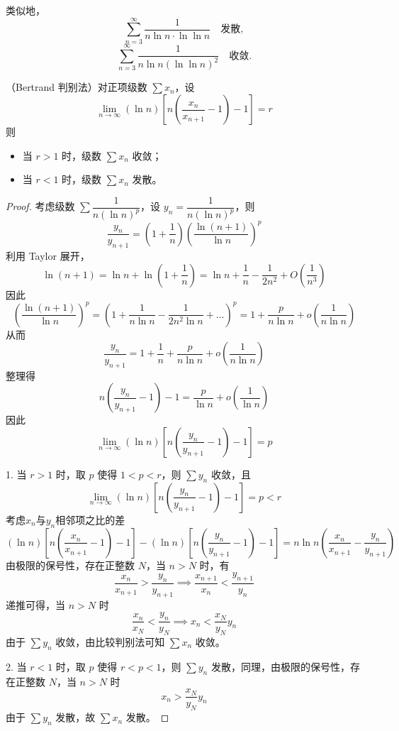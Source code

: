 类似地，
\[
\sum_{n=3}^{\infty} \frac{1}{n \ln n \cdot \ln \ln n} \quad \text{发散},
\]
\[
\sum_{n=3}^{\infty} \frac{1}{n \ln n (\ln \ln n)^2} \quad \text{收敛}.\]
\begin{proposition}
	（Bertrand 判别法）对正项级数 $\sum x_n$，设
	\[
	\lim_{n \to \infty} (\ln n) \left[ n \left( \frac{x_n}{x_{n+1}} - 1 \right) - 1 \right] = r
	\]
	则
	\begin{itemize}
		\item 当 $r > 1$ 时，级数 $\sum x_n$ 收敛；
		\item 当 $r < 1$ 时，级数 $\sum x_n$ 发散。
	\end{itemize}

\end{proposition}
\begin{proof}
	考虑级数 $\sum \dfrac{1}{n(\ln n)^p}$，设 $y_n = \dfrac{1}{n(\ln n)^p}$，则
	\[
	\frac{y_n}{y_{n+1}} = \left(1 + \frac{1}{n}\right) \left( \frac{\ln(n+1)}{\ln n} \right)^p
	\]
	利用 Taylor 展开，
	\[
	\ln(n+1) = \ln n + \ln\left(1+\frac{1}{n}\right) = \ln n + \frac{1}{n} - \frac{1}{2n^2} + O\left(\frac{1}{n^3}\right)
	\]
	因此
	\[
	\left( \frac{\ln(n+1)}{\ln n} \right)^p = \left( 1 + \frac{1}{n \ln n} - \frac{1}{2n^2 \ln n} + \dots \right)^p = 1 + \frac{p}{n \ln n} + o\left( \frac{1}{n \ln n} \right)
	\]
	从而
	\[
	\frac{y_n}{y_{n+1}} = 1 + \frac{1}{n} + \frac{p}{n \ln n} + o\left( \frac{1}{n \ln n} \right)
	\]
	整理得
	\[
	n \left( \frac{y_n}{y_{n+1}} - 1 \right) - 1 = \frac{p}{\ln n} + o\left( \frac{1}{\ln n} \right)
	\]
	因此
	\[
	\lim_{n \to \infty} (\ln n) \left[ n \left( \frac{y_n}{y_{n+1}} - 1 \right) - 1 \right] = p
	\]
	
	1.  当 $r > 1$ 时，取 $p$ 使得 $1 < p < r$，则 $\sum y_n$ 收敛，且
	\[
	\lim_{n \to \infty} (\ln n) \left[ n \left( \frac{y_n}{y_{n+1}} - 1 \right) - 1 \right] = p < r
	\]
	考虑$x_n$与$y_n$相邻项之比的差
	\[
	(\ln n) \left[ n \left( \frac{x_n}{x_{n+1}} - 1 \right) - 1 \right]-(\ln n) \left[ n \left( \frac{y_n}{y_{n+1}} - 1 \right) - 1 \right] = n \ln n (\frac{x_n}{x_{n+1}} -\frac{y_n}{y_{n+1}} )
	\]
	由极限的保号性，存在正整数 $N$，当 $n > N$ 时，有
	\[
	\frac{x_n}{x_{n+1}} > \frac{y_n}{y_{n+1}} \implies \frac{x_{n+1}}{x_n} < \frac{y_{n+1}}{y_n}
	\]
	递推可得，当 $n > N$ 时
	\[
	\frac{x_n}{x_N} < \frac{y_n}{y_N} \implies x_n < \frac{x_N}{y_N} y_n
	\]
	由于 $\sum y_n$ 收敛，由比较判别法可知 $\sum x_n$ 收敛。
	
	2.  当 $r < 1$ 时，取 $p$ 使得 $r < p < 1$，则 $\sum y_n$ 发散，同理，由极限的保号性，存在正整数 $N$，当 $n > N$ 时
	\[
	x_n > \frac{x_N}{y_N} y_n
	\]
	由于 $\sum y_n$ 发散，故 $\sum x_n$ 发散。
	
\end{proof}












